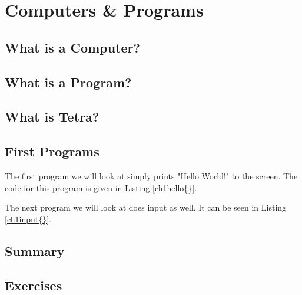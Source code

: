 \chapter{Computers \& Programs}


\section{What is a Computer?}






\section{What is a Program?}





\section{What is Tetra?}




\section{First Programs}

\def \codelabel {ch1hello}
The first program we will look at simply prints "Hello World!" to the screen.
The code for this program is given in Listing \ref{\codelabel{}}.




\def \codelabel {ch1input}
The next program we will look at does input as well.
It can be seen in Listing \ref{\codelabel{}}.


\section{Summary}


\section{Exercises}

